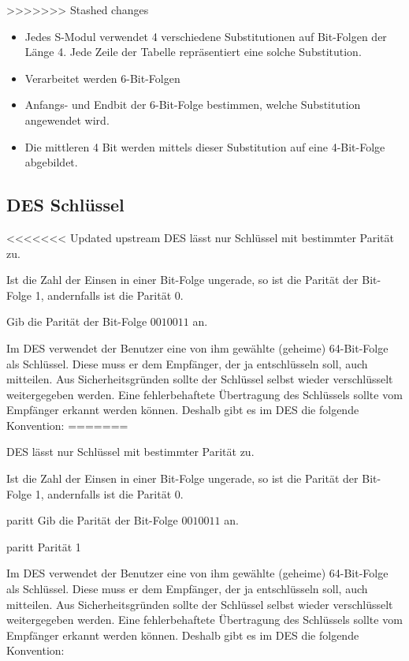 \documentclass[%
<<<<<<< Updated upstream
11pt,%
twoside,%
titlepage,%
german,%
headsepline%
]{scrartcl}
\begin{document}
>>>>>>> Stashed changes
\begin{itemize}
\item Jedes S-Modul verwendet 4 verschiedene Substitutionen auf Bit-Folgen der Länge 4. Jede Zeile der Tabelle repräsentiert eine solche Substitution.
\item Verarbeitet werden 6-Bit-Folgen
\item Anfangs- und Endbit der 6-Bit-Folge bestimmen, welche Substitution angewendet wird.
\item Die mittleren 4 Bit werden mittels dieser Substitution auf eine 4-Bit-Folge abgebildet.
\end{itemize}

\subsection{DES Schlüssel}
<<<<<<< Updated upstream
DES lässt nur Schlüssel mit bestimmter Parität zu.
\begin{cdef}[Parität]{}
Ist die Zahl der Einsen in einer Bit-Folge ungerade, so ist die Parität der Bit-Folge 1, andernfalls ist die Parität 0.
\end{cdef}

\begin{ueb}
Gib die Parität der Bit-Folge $0010011$ an.
\end{ueb}

Im DES verwendet der Benutzer eine von ihm gewählte (geheime) 64-Bit-Folge als Schlüssel. Diese muss er dem Empfänger, der ja entschlüsseln soll, auch mitteilen. Aus Sicherheitsgründen sollte der Schlüssel selbst wieder verschlüsselt weitergegeben werden. Eine fehlerbehaftete Übertragung des Schlüssels sollte vom Empfänger erkannt werden k\"onnen. Deshalb gibt es im DES die folgende Konvention:
=======

DES lässt nur Schlüssel mit bestimmter Parität zu.
\begin{cdef}[Parität]
Ist die Zahl der Einsen in einer Bit-Folge ungerade, so ist die Parität der Bit-Folge 1, andernfalls ist die Parität 0.
\end{cdef}

\begin{uebenv}{paritt}
Gib die Parität der Bit-Folge $0010011$ an.
\end{uebenv}

\begin{lsg}{paritt}
    Parität 1
\end{lsg}

Im DES verwendet der Benutzer eine von ihm gewählte (geheime) 64-Bit-Folge als Schlüssel. Diese muss er dem Empfänger, der ja entschlüsseln soll, auch mitteilen. Aus Sicherheitsgründen sollte der Schlüssel selbst wieder verschlüsselt weitergegeben werden. Eine fehlerbehaftete Übertragung des Schlüssels sollte vom Empfänger erkannt werden können. Deshalb gibt es im DES die folgende Konvention:
\end{document}
